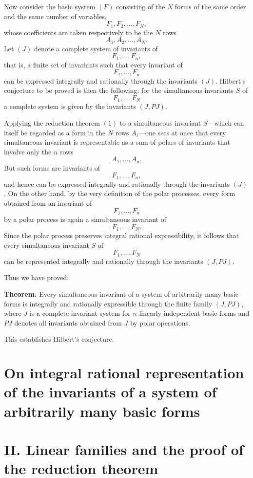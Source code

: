 \documentclass[11pt]{article}
\begin{document}
Now consider the basic system \((F)\) consisting of the \(N\) forms of the same order and the same number of variables,
\[
F_1,F_2,\dots,F_N,
\]
whose coefficients are taken respectively to be the \(N\) rows
\[
A_1,A_2,\dots,A_N.
\]
Let \((J)\) denote a complete system of invariants of
\[
F_1,\dots,F_n,
\]
that is, a finite set of invariants such that every invariant of
\[
F_1,\dots,F_n
\]
can be expressed integrally and rationally through the invariants \((J)\). Hilbert's conjecture to be proved is then the following: for the simultaneous invariants \(S\) of
\[
F_1,\dots,F_N
\]
a complete system is given by the invariants \((J,PJ)\).

Applying the reduction theorem \((1)\) to a simultaneous invariant \(S\)---which can itself be regarded as a form in the \(N\) rows \(A_i\)---one sees at once that every simultaneous invariant is representable as a sum of polars of invariants that involve only the \(n\) rows
\[
A_1,\dots,A_n.
\]
But such forms are invariants of
\[
F_1,\dots,F_n,
\]
and hence can be expressed integrally and rationally through the invariants \((J)\). On the other hand, by the very definition of the polar processes, every form obtained from an invariant of
\[
F_1,\dots,F_n
\]
by a polar process is again a simultaneous invariant of
\[
F_1,\dots,F_N.
\]
Since the polar process preserves integral rational expressibility, it follows that every simultaneous invariant \(S\) of
\[
F_1,\dots,F_N
\]
can be represented integrally and rationally through the invariants \((J,PJ)\).

Thus we have proved:

\medskip
\noindent\textbf{Theorem.}
Every simultaneous invariant of a system of arbitrarily many basic forms is integrally and rationally expressible through the finite family \((J,PJ)\), where \(J\) is a complete invariant system for \(n\) linearly independent basic forms and \(PJ\) denotes all invariants obtained from \(J\) by polar operations.

\medskip
This establishes Hilbert's conjecture.

\bigskip
\clearpage
\section*{On integral rational representation of the invariants of a system of arbitrarily many basic forms}

\section*{II. Linear families and the proof of the reduction theorem}
\end{document}
